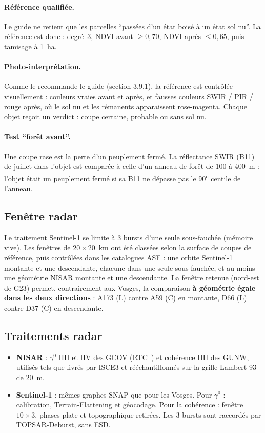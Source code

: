 \paragraph{Référence qualifiée.} Le guide ne retient que les parcelles \enquote{passées d'un état boisé à un état
sol nu}. La référence est donc : degré~3, NDVI avant $\geq 0{,}70$, NDVI après $\leq 0{,}65$, puis tamisage à
1~ha.

\paragraph{Photo-interprétation.} Comme le recommande le guide (section 3.9.1), la référence est contrôlée
visuellement : couleurs vraies avant et après, et fausses couleurs SWIR / PIR / rouge après, où le sol nu et les
rémanents apparaissent rose-magenta. Chaque objet reçoit un verdict : coupe certaine, probable ou sans sol nu.

\paragraph{Test \enquote{forêt avant}.} Une coupe rase est la perte d'un peuplement fermé. La réflectance SWIR
(B11) de juillet dans l'objet est comparée à celle d'un anneau de forêt de 100 à 400~m : l'objet était un
peuplement fermé si sa B11 ne dépasse pas le 90\textsuperscript{e} centile de l'anneau.

\subsection{Fenêtre radar}

Le traitement Sentinel-1 se limite à 3 bursts d'une seule sous-fauchée (mémoire vive). Les fenêtres de
$20\times20$~km ont été classées selon la surface de coupes de référence, puis contrôlées dans les catalogues ASF :
une orbite Sentinel-1 montante et une descendante, chacune dans une seule sous-fauchée, et au moins une géométrie
NISAR montante et une descendante. La fenêtre retenue (nord-est de G23) permet, contrairement aux Vosges, la
comparaison \textbf{à géométrie égale dans les deux directions} : A173 (L) contre A59 (C) en montante, D66 (L)
contre D37 (C) en descendante.

\subsection{Traitements radar}

\begin{itemize}
\item \textbf{NISAR} : $\gamma^0$ HH et HV des GCOV (RTC~\cite{small2011flattening}) et cohérence HH des GUNW,
  utilisés tels que livrés par ISCE3 et rééchantillonnés sur la grille Lambert 93 de 20~m.
\item \textbf{Sentinel-1} : mêmes graphes SNAP que pour les Vosges. Pour $\gamma^0$ : calibration,
  Terrain-Flattening et géocodage. Pour la cohérence : fenêtre $10\times3$, phases plate et topographique
  retirées. Les 3 bursts sont raccordés par TOPSAR-Deburst, sans ESD.
\end{itemize}

